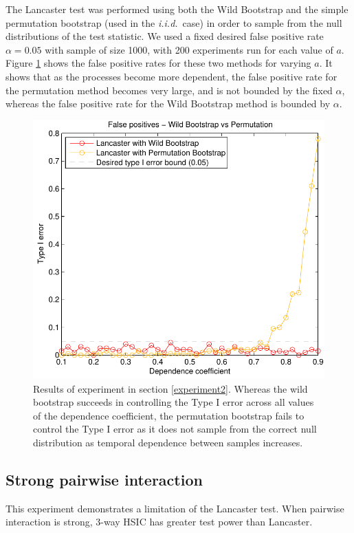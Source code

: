 \documentclass[]{article}
\begin{document}
The Lancaster test was performed using both the Wild Bootstrap and the simple permutation bootstrap (used in the \emph{i.i.d.}~case) in order to sample from the null distributions of the test statistic. We used a fixed desired false positive rate $\alpha = 0.05$ with sample of size 1000, with 200 experiments run for each value of $a$. Figure \ref{wildBootstrap_is_necessary} shows the false positive rates for these two methods for varying $a$. It shows that as the processes become more dependent, the false positive rate for the permutation method becomes very large, and is not bounded by the fixed $\alpha$, whereas the false positive rate for the Wild Bootstrap method is bounded by $\alpha$.
\begin{figure}[ht]
\vskip 0.2in
\begin{center}
\centerline{\includegraphics[scale=0.6]{UAI_Figure2.pdf}}
\caption{Results of experiment in section \ref{experiment2}. Whereas the wild bootstrap succeeds in controlling the Type I error across all values of the dependence coefficient, the permutation bootstrap fails to control the Type I error as it does not sample from the correct null distribution as temporal dependence between samples increases.}
\label{wildBootstrap_is_necessary}
\end{center}
\vskip -0.2in
\end{figure} 


\subsection{Strong pairwise interaction}\label{experiment3}
This experiment demonstrates a limitation of the Lancaster test. When pairwise interaction is strong, 3-way HSIC has greater test power than Lancaster.
\end{document}
